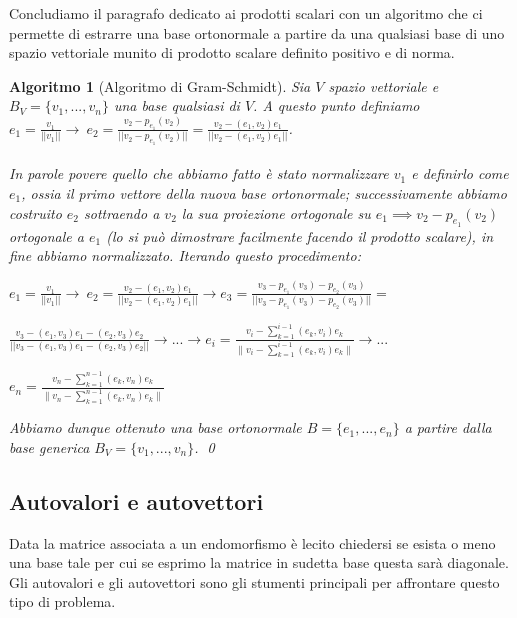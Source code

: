 \documentclass[a4paper,12pt]{report}
\newtheorem{algoritmo}{Algoritmo}[chapter]
\begin{document}
 Concludiamo il paragrafo dedicato ai prodotti scalari con un algoritmo che ci permette di estrarre una base ortonormale a partire da una qualsiasi base di uno spazio vettoriale munito di prodotto scalare definito positivo e di norma.

\begin{algoritmo}[Algoritmo di Gram-Schmidt]\label{alg: 1.1}
    Sia $V$ spazio vettoriale e $B_V=\{v_1,...,v_n\}$ una base qualsiasi di $V$. A questo punto definiamo $e_1=\frac{v_1}{||v_1||} \to \ e_2=\frac{v_2-p_{e_1}(v_2)}{||v_2-p_{e_1}(v_2)||}=\frac{v_2-(e_1,v_2)e_1}{||v_2-(e_1,v_2)e_1||}$. 
    \\
    \\In parole povere quello che abbiamo fatto è stato normalizzare $v_1$ e definirlo come $e_1$, ossia il primo vettore della nuova base ortonormale; successivamente abbiamo costruito $e_2$ sottraendo a $v_2$ la sua proiezione ortogonale su $e_1 \implies v_2-p_{e_1}(v_2)$ ortogonale a $e_1$ (lo si può dimostrare facilmente facendo il prodotto scalare), in fine abbiamo normalizzato. Iterando questo procedimento:
    \\ \begin{center}
        $e_1=\frac{v_1}{||v_1||} \to \ e_2=\frac{v_2-(e_1,v_2)e_1}{||v_2-(e_1,v_2)e_1||} \to e_3=\frac{v_3-p_{e_1}(v_3)-p_{e_2}(v_3)}{||v_3-p_{e_1}(v_3)-p_{e_2}(v_3)||}=$
    \end{center} 
    \begin{center}
        $\frac{v_3-(e_1,v_3)e_1-(e_2,v_3)e_2}{||v_3-(e_1,v_3)e_1-(e_2,v_3)e_2||} \to ... \to e_i=\frac{\displaystyle v_i-\sum_{k=1}^{i-1}(e_k,v_i)e_k}{\displaystyle\bigg\|v_i-\sum_{k=1}^{i-1}(e_k,v_i)e_k\bigg\|} \to...$
    \end{center}
    \begin{center}
        $e_n=\frac{\displaystyle v_n-\sum_{k=1}^{n-1}(e_k,v_n)e_k}{\displaystyle\bigg\|v_n-\sum_{k=1}^{n-1}(e_k,v_n)e_k\bigg\|}$
    \end{center}
    Abbiamo dunque ottenuto una base ortonormale $B=\{e_1,...,e_n\}$ a partire dalla base generica $B_V=\{v_1,...,v_n\}$.  \qed
\end{algoritmo}

\newpage

\subsection{Autovalori e autovettori}

Data la matrice associata a un endomorfismo è lecito chiedersi se esista o meno una base tale per cui se esprimo la matrice in sudetta base questa sarà diagonale. Gli autovalori e gli autovettori sono gli stumenti principali per affrontare questo tipo di problema.
\end{document}
